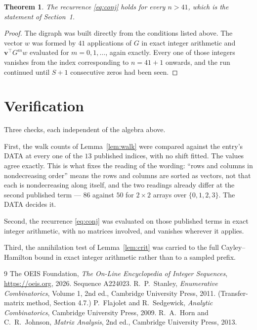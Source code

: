 \documentclass[11pt,a4paper]{article}
\theoremstyle{plain}
\newtheorem{theorem}{Theorem}
\theoremstyle{definition}
\begin{document}
\begin{theorem}
The recurrence \eqref{eq:conj} holds for every $n>41$, which is the statement of
Section~1.
\end{theorem}

\begin{proof}
The digraph was built directly from the conditions listed above. The vector $w$ was formed by
$41$ applications of $G$ in exact integer arithmetic and $\mathbf{v}^{\!\top}G^{m}w$
evaluated for $m=0,1,\dots$, again exactly. Every one of those integers vanishes from the
index corresponding to $n=41+1$ onwards, and the run continued until $S+1$ consecutive
zeros had been seen.
\end{proof}

\section{Verification}

Three checks, each independent of the algebra above.

First, the walk counts of Lemma~\ref{lem:walk} were compared against the entry's DATA at
every one of the $13$ published indices, with no shift fitted. The values agree exactly.
This is what fixes the reading of the wording: ``rows and columns in nondecreasing order''
means the rows and columns are sorted as vectors, not that each is nondecreasing along
itself, and the two readings already differ at the second published term --- $86$ against
$50$ for $2\times2$ arrays over $\{0,1,2,3\}$. The DATA decides it.

Second, the recurrence \eqref{eq:conj} was evaluated on those published terms in exact
integer arithmetic, with no matrices involved, and vanishes wherever it applies.

Third, the annihilation test of Lemma~\ref{lem:crit} was carried to the full
Cayley--Hamilton bound in exact integer arithmetic rather than to a sampled prefix.

\begin{thebibliography}{9}
 The OEIS Foundation, \emph{The On-Line Encyclopedia of Integer
Sequences}, \url{https://oeis.org}, 2026. Sequence A224023.
 R.~P.~Stanley, \emph{Enumerative Combinatorics}, Volume 1, 2nd ed.,
Cambridge University Press, 2011. (Transfer-matrix method, Section 4.7.)
 P.~Flajolet and R.~Sedgewick, \emph{Analytic Combinatorics}, Cambridge
University Press, 2009.
 R.~A.~Horn and C.~R.~Johnson, \emph{Matrix Analysis}, 2nd ed., Cambridge
University Press, 2013.
\end{thebibliography}
\end{document}
